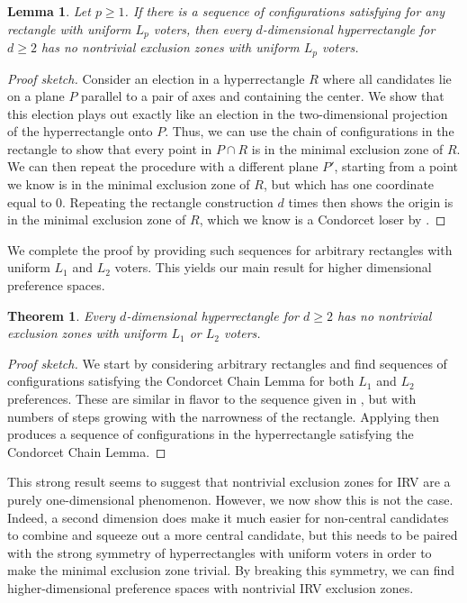 \documentclass{article}
\theoremstyle{theorem}
\newtheorem{lemma}{Lemma}
\newtheorem{theorem}{Theorem}
\theoremstyle{definition}
\begin{document}
\begin{lemma}\label{lemma:rect-to-hyper}
  Let $p \ge 1$. If there is a sequence of configurations satisfying  for any rectangle with uniform $L_p$ voters, then every $d$-dimensional hyperrectangle for $d \ge 2$ has no nontrivial exclusion zones with uniform $L_p$ voters. 
\end{lemma}
\begin{proof}[Proof sketch]
Consider an election in a hyperrectangle $R$ where all candidates lie on a plane $P$ parallel to a pair of axes and containing the center. We show that this election plays out exactly like an election in the two-dimensional projection of the hyperrectangle onto $P$. Thus, we can use the chain of configurations in the rectangle to show that every point in $P \cap R$ is in the minimal exclusion zone of $R$. We can then repeat the procedure with a different plane $P'$, starting from a point we know is in the minimal exclusion zone of $R$, but which has one coordinate equal to 0. Repeating the rectangle construction $d$ times then shows the origin is in the minimal exclusion zone of $R$, which we know is a Condorcet loser by .
\end{proof}

We complete the proof by providing such sequences for arbitrary rectangles with uniform $L_1$ and $L_2$ voters. This yields our main result for higher dimensional preference spaces. 



\begin{theorem}\label{thm:hyperrect-trivial-minimal}
Every $d$-dimensional hyperrectangle for $d \ge 2$ has no nontrivial exclusion zones with uniform $L_1$ or $L_2$ voters. 
\end{theorem}
\begin{proof}[Proof sketch]
  We start by considering arbitrary rectangles and find sequences of configurations satisfying the Condorcet Chain Lemma for both $L_1$ and $L_2$ preferences. These are similar in flavor to the sequence given in , but with numbers of steps growing with the narrowness of the rectangle. Applying  then produces a sequence of configurations in the hyperrectangle satisfying the Condorcet Chain Lemma.
\end{proof}

This strong result seems to suggest that nontrivial exclusion zones for IRV are a purely one-dimensional phenomenon. However, we now show this is not the case. Indeed, a second dimension does make it much easier for non-central candidates to combine and squeeze out a more central candidate, but this needs to be paired with the strong symmetry of hyperrectangles with uniform voters in order to make the minimal exclusion zone trivial. By breaking this symmetry, we can find higher-dimensional preference spaces with nontrivial IRV exclusion zones. 
\end{document}
